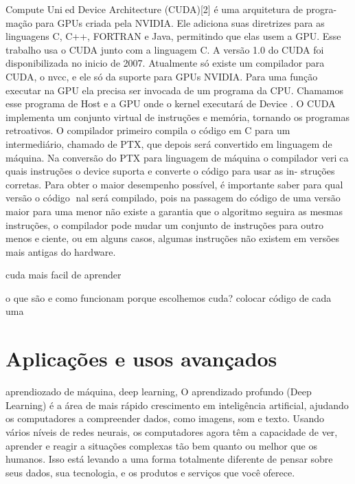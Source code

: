 Compute Unied Device Architecture (CUDA)[2] é uma arquitetura de progra-
mação para GPUs criada pela NVIDIA. Ele adiciona suas diretrizes para as
linguagens C, C++, FORTRAN e Java, permitindo que elas usem a GPU. Esse
trabalho usa o CUDA junto com a linguagem C. A versão 1.0 do CUDA foi
disponibilizada no inicio de 2007. Atualmente só existe um compilador para
CUDA, o nvcc, e ele só da suporte para GPUs NVIDIA.
Para uma função executar na GPU ela precisa ser invocada de um programa
da CPU. Chamamos esse programa de Host e a GPU onde o kernel executará
de Device .
O CUDA implementa um conjunto virtual de instruções e memória, tornando
os programas retroativos. O compilador primeiro compila o código em C para
um intermediário, chamado de PTX, que depois será convertido em linguagem
de máquina. Na conversão do PTX para linguagem de máquina o compilador
verica quais instruções o device suporta e converte o código para usar as in-
struções corretas. Para obter o maior desempenho possível, é importante saber
para qual versão o código nal será compilado, pois na passagem do código de
uma versão maior para uma menor não existe a garantia que o algoritmo seguira
as mesmas instruções, o compilador pode mudar um conjunto de instruções para
outro menos eciente, ou em alguns casos, algumas instruções não existem em
versões mais antigas do hardware.


cuda mais facil de aprender


  o que são e como funcionam
  porque escolhemos cuda?
  colocar código de cada uma

\section{Aplicações e usos avançados}

aprendiozado de máquina, deep learning,
O aprendizado profundo (Deep Learning) é a área de mais rápido crescimento em inteligência artificial, ajudando os computadores a compreender dados, como imagens, som e texto. Usando vários níveis de redes neurais, os computadores agora têm a capacidade de ver, aprender e reagir a situações complexas tão bem quanto ou melhor que os humanos. Isso está levando a uma forma totalmente diferente de pensar sobre seus dados, sua tecnologia, e os produtos e serviços que você oferece.

